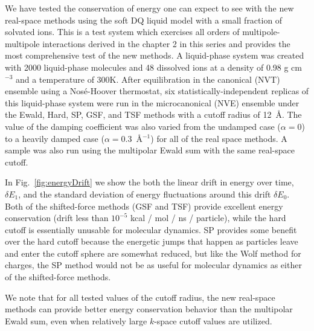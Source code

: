 We have tested the conservation of energy one can expect to see with
the new real-space methods using the soft DQ liquid model with a small
fraction of solvated ions. This is a test system which exercises all
orders of multipole-multipole interactions derived in the chapter 2
in this series and provides the most comprehensive test of the new
methods.  A liquid-phase system was created with 2000 liquid-phase
molecules and 48 dissolved ions at a density of 0.98 g cm$^{-3}$ and a
temperature of 300K.  After equilibration in the canonical (NVT)
ensemble using a Nos\'e-Hoover thermostat, six
statistically-independent replicas of this liquid-phase system were
run in the microcanonical (NVE) ensemble under the Ewald, Hard, SP,
GSF, and TSF methods with a cutoff radius of 12~\AA.  The value of the
damping coefficient was also varied from the undamped case ($\alpha =
0$) to a heavily damped case ($\alpha = 0.3$~\AA$^{-1}$) for all of
the real space methods.  A sample was also run using the multipolar
Ewald sum with the same real-space cutoff.

In Fig.~\ref{fig:energyDrift} we show the both the linear drift in
energy over time, $\delta E_1$, and the standard deviation of energy
fluctuations around this drift $\delta E_0$.  Both of the
shifted-force methods (GSF and TSF) provide excellent energy
conservation (drift less than $10^{-5}$ kcal / mol / ns / particle),
while the hard cutoff is essentially unusable for molecular dynamics.
SP provides some benefit over the hard cutoff because the energetic
jumps that happen as particles leave and enter the cutoff sphere are
somewhat reduced, but like the Wolf method for charges, the SP method
would not be as useful for molecular dynamics as either of the
shifted-force methods.

We note that for all tested values of the cutoff radius, the new
real-space methods can provide better energy conservation behavior
than the multipolar Ewald sum, even when relatively large $k$-space
cutoff values are utilized.

